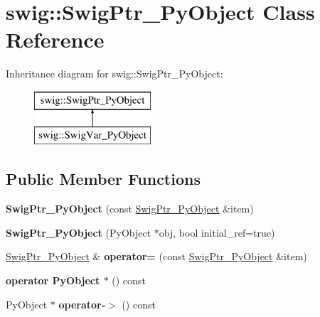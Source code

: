 \hypertarget{classswig_1_1_swig_ptr___py_object}{}\section{swig\+:\+:Swig\+Ptr\+\_\+\+Py\+Object Class Reference}
\label{classswig_1_1_swig_ptr___py_object}
Inheritance diagram for swig\+:\+:Swig\+Ptr\+\_\+\+Py\+Object\+:\begin{figure}[H]
\begin{center}
\leavevmode
\includegraphics[height=2.000000cm]{classswig_1_1_swig_ptr___py_object}
\end{center}
\end{figure}
\subsection*{Public Member Functions}
\begin{DoxyCompactItemize}
\item 
\mbox{\label{classswig_1_1_swig_ptr___py_object_a4282f20207f8cd22c9b079203c832a04}} 
{\bfseries Swig\+Ptr\+\_\+\+Py\+Object} (const \hyperlink{classswig_1_1_swig_ptr___py_object}{Swig\+Ptr\+\_\+\+Py\+Object} \&item)
\item 
\mbox{\label{classswig_1_1_swig_ptr___py_object_a4503d58d577d209f5e1fa67026852505}} 
{\bfseries Swig\+Ptr\+\_\+\+Py\+Object} (Py\+Object $\ast$obj, bool initial\+\_\+ref=true)
\item 
\mbox{\label{classswig_1_1_swig_ptr___py_object_a86d8657d6b4a27c8e9e6942bc1ba572c}} 
\hyperlink{classswig_1_1_swig_ptr___py_object}{Swig\+Ptr\+\_\+\+Py\+Object} \& {\bfseries operator=} (const \hyperlink{classswig_1_1_swig_ptr___py_object}{Swig\+Ptr\+\_\+\+Py\+Object} \&item)
\item 
\mbox{\label{classswig_1_1_swig_ptr___py_object_a488cefbaa1b44892dca63570d463f926}} 
{\bfseries operator Py\+Object $\ast$} () const
\item 
\mbox{\label{classswig_1_1_swig_ptr___py_object_abcd310284d78ccf1041fb60906bc115e}} 
Py\+Object $\ast$ {\bfseries operator-\/$>$} () const
\end{DoxyCompactItemize}
